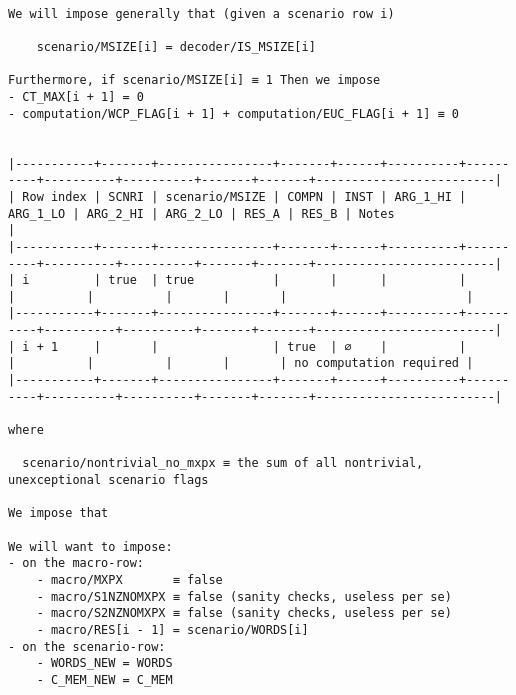 \documentclass[varwidth=\maxdimen,margin=0.5cm,multi={verbatim}]{standalone}
\begin{document}
\begin{verbatim}

We will impose generally that (given a scenario row i)

	scenario/MSIZE[i] = decoder/IS_MSIZE[i]

Furthermore, if scenario/MSIZE[i] ≡ 1 Then we impose
- CT_MAX[i + 1] = 0
- computation/WCP_FLAG[i + 1] + computation/EUC_FLAG[i + 1] ≡ 0


|-----------+-------+----------------+-------+------+----------+----------+----------+----------+-------+-------+-------------------------|
| Row index | SCNRI | scenario/MSIZE | COMPN | INST | ARG_1_HI | ARG_1_LO | ARG_2_HI | ARG_2_LO | RES_A | RES_B | Notes                   |
|-----------+-------+----------------+-------+------+----------+----------+----------+----------+-------+-------+-------------------------|
| i         | true  | true           |       |      |          |          |          |          |       |       |                         |
|-----------+-------+----------------+-------+------+----------+----------+----------+----------+-------+-------+-------------------------|
| i + 1     |       |                | true  | ∅    |          |          |          |          |       |       | no computation required |
|-----------+-------+----------------+-------+------+----------+----------+----------+----------+-------+-------+-------------------------|

where 

  scenario/nontrivial_no_mxpx ≡ the sum of all nontrivial, unexceptional scenario flags

We impose that

We will want to impose:
- on the macro-row:
	- macro/MXPX       ≡ false
	- macro/S1NZNOMXPX ≡ false (sanity checks, useless per se)
	- macro/S2NZNOMXPX ≡ false (sanity checks, useless per se)
	- macro/RES[i - 1] = scenario/WORDS[i]
- on the scenario-row:
	- WORDS_NEW = WORDS
	- C_MEM_NEW = C_MEM

\end{verbatim}
\end{document}
